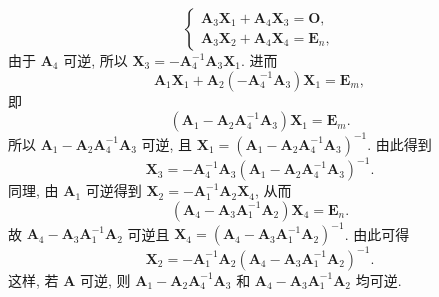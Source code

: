 \documentclass[../../main.tex]{subfiles}%
\begin{document}
\begin{solution}
\[\begin{cases}
\boldsymbol{A}_3\boldsymbol{X}_1 + \boldsymbol{A}_4\boldsymbol{X}_3 = \boldsymbol{O}, \\
\boldsymbol{A}_3\boldsymbol{X}_2 + \boldsymbol{A}_4\boldsymbol{X}_4 = \boldsymbol{E}_n,
\end{cases}
\]
由于 \(\boldsymbol{A}_4\) 可逆, 所以 \(\boldsymbol{X}_3 = -\boldsymbol{A}_4^{-1}\boldsymbol{A}_3\boldsymbol{X}_1\). 进而
\[
\boldsymbol{A}_1\boldsymbol{X}_1 + \boldsymbol{A}_2(-\boldsymbol{A}_4^{-1}\boldsymbol{A}_3)\boldsymbol{X}_1 = \boldsymbol{E}_m,
\]
即
\[
(\boldsymbol{A}_1 - \boldsymbol{A}_2\boldsymbol{A}_4^{-1}\boldsymbol{A}_3)\boldsymbol{X}_1 = \boldsymbol{E}_m.
\]
所以 \(\boldsymbol{A}_1 - \boldsymbol{A}_2\boldsymbol{A}_4^{-1}\boldsymbol{A}_3\) 可逆, 且 \(\boldsymbol{X}_1 = (\boldsymbol{A}_1 - \boldsymbol{A}_2\boldsymbol{A}_4^{-1}\boldsymbol{A}_3)^{-1}\). 由此得到
\[
\boldsymbol{X}_3 = -\boldsymbol{A}_4^{-1}\boldsymbol{A}_3(\boldsymbol{A}_1 - \boldsymbol{A}_2\boldsymbol{A}_4^{-1}\boldsymbol{A}_3)^{-1}.
\]
同理, 由 \(\boldsymbol{A}_1\) 可逆得到 \(\boldsymbol{X}_2 = -\boldsymbol{A}_1^{-1}\boldsymbol{A}_2\boldsymbol{X}_4\), 从而
\[
(\boldsymbol{A}_4 - \boldsymbol{A}_3\boldsymbol{A}_1^{-1}\boldsymbol{A}_2)\boldsymbol{X}_4 = \boldsymbol{E}_n.
\]
故 \(\boldsymbol{A}_4 - \boldsymbol{A}_3\boldsymbol{A}_1^{-1}\boldsymbol{A}_2\) 可逆且 \(\boldsymbol{X}_4 = (\boldsymbol{A}_4 - \boldsymbol{A}_3\boldsymbol{A}_1^{-1}\boldsymbol{A}_2)^{-1}\). 由此可得
\[
\boldsymbol{X}_2 = -\boldsymbol{A}_1^{-1}\boldsymbol{A}_2(\boldsymbol{A}_4 - \boldsymbol{A}_3\boldsymbol{A}_1^{-1}\boldsymbol{A}_2)^{-1}.
\]
这样, 若 \(\boldsymbol{A}\) 可逆, 则 \(\boldsymbol{A}_1 - \boldsymbol{A}_2\boldsymbol{A}_4^{-1}\boldsymbol{A}_3\) 和 \(\boldsymbol{A}_4 - \boldsymbol{A}_3\boldsymbol{A}_1^{-1}\boldsymbol{A}_2\) 均可逆.


\end{solution}
\end{document}
